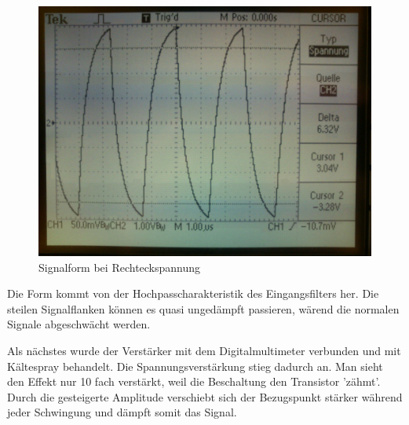 \begin{figure}[H]
	\centering
	\includegraphics[width=\linewidth]{versuch5/oszi/DSC_0458.JPG}
	\caption{Signalform bei Rechteckspannung}
\end{figure}
Die Form kommt von der Hochpasscharakteristik des Eingangsfilters her. Die steilen Signalflanken können es quasi ungedämpft passieren, wärend die normalen Signale abgeschwächt werden.

Als nächstes wurde der Verstärker mit dem Digitalmultimeter verbunden und mit Kältespray behandelt. Die Spannungsverstärkung stieg dadurch an. Man sieht den Effekt nur 10 fach verstärkt, weil die Beschaltung den Transistor 'zähmt'. Durch die gesteigerte Amplitude verschiebt sich der Bezugspunkt stärker während jeder Schwingung und dämpft somit das Signal.

